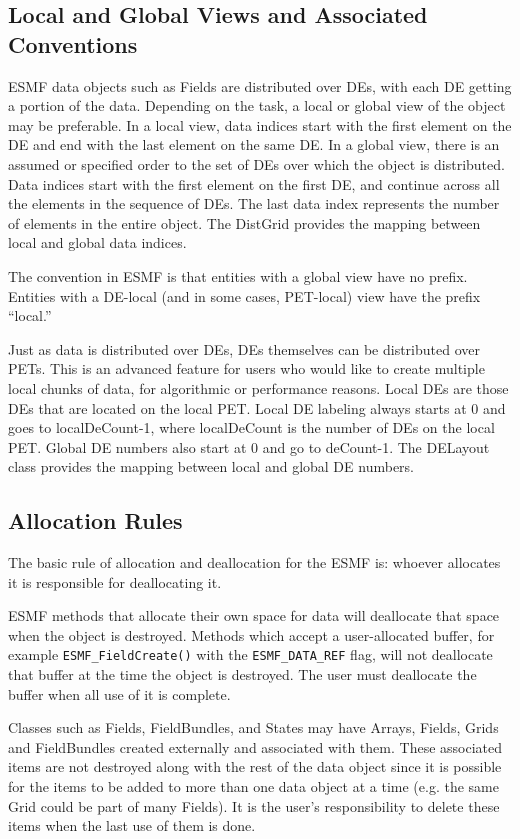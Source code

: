 \subsection{Local and Global Views and Associated Conventions}

ESMF data objects such as Fields are distributed over
DEs, with each DE getting a portion of the data.  Depending
on the task, a local or global view of the object may be
preferable.  In a local view, data indices start with the first
element on the DE and end with the last element on the same DE.
In a global view, there is an assumed or specified order to
the set of DEs over which the object is distributed.  Data
indices start with the first element on the first DE, and
continue across all the elements in the sequence of DEs.
The last data index represents the number of elements in the
entire object.  The DistGrid provides the mapping between
local and global data indices.

The convention in ESMF is that entities with a global view
have no prefix.  Entities with a DE-local (and in some cases,
PET-local) view have the prefix ``local.''

Just as data is distributed over DEs, DEs themselves can be
distributed over PETs.  This is an advanced feature for users
who would like to create multiple local chunks of data, for
algorithmic or performance reasons.
Local DEs are those DEs that are located on the local PET.
Local DE labeling always starts at 0 and goes to localDeCount-1,
where localDeCount is the number of DEs on the local PET.
Global DE numbers also start at 0 and go to deCount-1.
The DELayout class provides the mapping between local
and global DE numbers. 

\subsection{Allocation Rules}

The basic rule of allocation and deallocation for the ESMF is:
whoever allocates it is responsible for deallocating it.

ESMF methods that allocate their own space for data will
deallocate that space when the object is destroyed. 
Methods which accept a user-allocated buffer, for example
{\tt ESMF\_FieldCreate()} with the {\tt ESMF\_DATA\_REF} flag,
will not deallocate that buffer at the time the object is
destroyed.  The user must deallocate the buffer
when all use of it is complete.

Classes such as Fields, FieldBundles, and States may have Arrays, 
Fields, Grids and FieldBundles created externally and associated with
them.  These associated items are not destroyed along with the rest  
of the data object since it is possible for the items to be added 
to more than one data object at a time (e.g. the same Grid could 
be part of many Fields).  It is the user's responsibility to delete 
these items when the last use of them is done.


